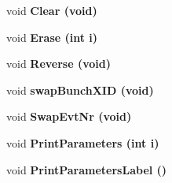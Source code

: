 \begin{CompactItemize}
\item 
void \bf{Clear} (void)\label{classLConverter_759b063976d217a0b78a5896a84af311}

\item 
void \bf{Erase} (int i)\label{classLConverter_6a6c6622dc9ec3d1f4a8bd7fb7943b13}

\item 
void \bf{Reverse} (void)\label{classLConverter_54718f7173ebebf84279e7a174a27019}

\item 
void \bf{swap\-Bunch\-XID} (void)\label{classLConverter_41a63f9c0091d9d49d4a3580c5d12c01}

\item 
void \bf{Swap\-Evt\-Nr} (void)\label{classLConverter_d5573dbf394c988cecf7ddb5777699bf}

\item 
void \bf{Print\-Parameters} (int i)\label{classLConverter_febd4991b9fe925b99900a3bb1a42203}

\item 
void \bf{Print\-Parameters\-Label} ()\label{classLConverter_3deb8a0bcb9c225e5b93eb3b8d986e73}

\end{CompactItemize}
